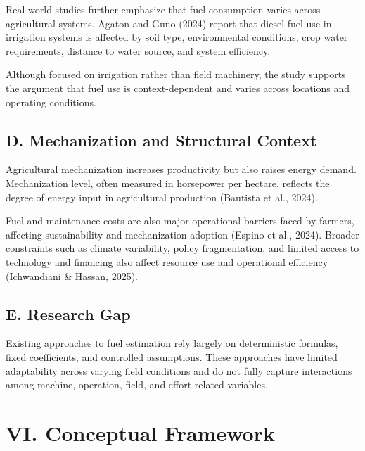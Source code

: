 \documentclass[11pt,twocolumn]{article}
\begin{document}
\vspace{10pt}

Real-world studies further emphasize that fuel consumption varies across agricultural systems. Agaton and Guno (2024) report that diesel fuel use in irrigation systems is affected by soil type, environmental conditions, crop water requirements, distance to water source, and system efficiency.

\vspace{10pt}

Although focused on irrigation rather than field machinery, the study supports the argument that fuel use is context-dependent and varies across locations and operating conditions.

\subsection*{D. Mechanization and Structural Context}

\vspace{10pt}

Agricultural mechanization increases productivity but also raises energy demand. Mechanization level, often measured in horsepower per hectare, reflects the degree of energy input in agricultural production (Bautista et al., 2024).

\vspace{10pt}

Fuel and maintenance costs are also major operational barriers faced by farmers, affecting sustainability and mechanization adoption (Espino et al., 2024). Broader constraints such as climate variability, policy fragmentation, and limited access to technology and financing also affect resource use and operational efficiency (Ichwandiani \& Hassan, 2025).

\subsection*{E. Research Gap}

\vspace{10pt}

Existing approaches to fuel estimation rely largely on deterministic formulas, fixed coefficients, and controlled assumptions. These approaches have limited adaptability across varying field conditions and do not fully capture interactions among machine, operation, field, and effort-related variables.

\section*{VI. Conceptual Framework}
\end{document}
